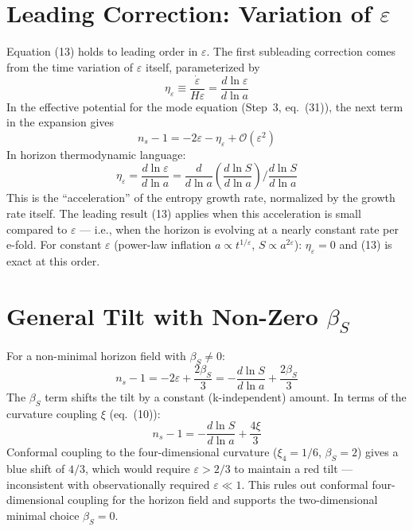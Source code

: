 \documentclass[12pt,a4paper]{article}
\begin{document}
\section{Leading Correction: Variation of $\varepsilon$}

Equation (13) holds to leading order in $\varepsilon$. The first subleading correction comes from the time variation of $\varepsilon$ itself, parameterized by
\begin{equation}
\eta_\varepsilon \equiv \frac{\dot{\varepsilon}}{H\varepsilon} = \frac{d\ln\varepsilon}{d\ln a} \tag{15}
\end{equation}
In the effective potential for the mode equation (Step~3, eq.~(31)), the next term in the expansion gives
\begin{equation}
n_s - 1 = -2\varepsilon - \eta_\varepsilon + \mathcal{O}(\varepsilon^2) \tag{16}
\end{equation}
In horizon thermodynamic language:
\begin{equation}
\eta_\varepsilon = \frac{d\ln\varepsilon}{d\ln a} = \frac{d}{d\ln a}\!\left(\frac{d\ln S}{d\ln a}\right) \bigg/ \frac{d\ln S}{d\ln a} \tag{17}
\end{equation}
This is the ``acceleration'' of the entropy growth rate, normalized by the growth rate itself. The leading result (13) applies when this acceleration is small compared to $\varepsilon$ --- i.e., when the horizon is evolving at a nearly constant rate per e-fold. For constant $\varepsilon$ (power-law inflation $a \propto t^{1/\varepsilon}$, $S \propto a^{2\varepsilon}$): $\eta_\varepsilon = 0$ and (13) is exact at this order.

\section{General Tilt with Non-Zero $\beta_S$}

For a non-minimal horizon field with $\beta_S \neq 0$:
\begin{equation}
n_s - 1 = -2\varepsilon + \frac{2\beta_S}{3} = -\frac{d\ln S}{d\ln a} + \frac{2\beta_S}{3} \tag{18}
\end{equation}
The $\beta_S$ term shifts the tilt by a constant (k-independent) amount. In terms of the curvature coupling $\xi$ (eq.~(10)):
\begin{equation}
n_s - 1 = -\frac{d\ln S}{d\ln a} + \frac{4\xi}{3} \tag{19}
\end{equation}
Conformal coupling to the four-dimensional curvature ($\xi_4 = 1/6$, $\beta_S = 2$) gives a blue shift of $4/3$, which would require $\varepsilon > 2/3$ to maintain a red tilt --- inconsistent with observationally required $\varepsilon \ll 1$. This rules out conformal four-dimensional coupling for the horizon field and supports the two-dimensional minimal choice $\beta_S = 0$.
\end{document}

